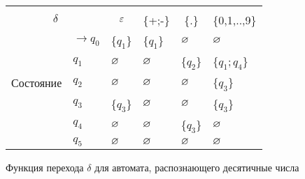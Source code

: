 \begin{figure}[h]
\centering
\begin{tabular}{llllll}
\toprule
%
\multicolumn{2}{c}{\multirow{2}{*}{\Large $\delta$}}
	& \multicolumn{4}{c}{\text{Вход}} \\
%
\cmidrule(rl){3-6}
%
\multicolumn{2}{c}{}
	& \multicolumn{1}{c}{$\varepsilon$}
    & \multicolumn{1}{c}{\{+;-\}}
    & \multicolumn{1}{c}{\{.\}}
    & \multicolumn{1}{c}{\{0,1,..,9\}} \\
%
\midrule
%
\multirow{5}{*}{Состояние}
    & $\to q_0$ & \{$q_1$\} 	& \{$q_1$\} 	& $\varnothing$ 		& $\varnothing$ \\
    & $q_1$ & $\varnothing$ 		& $\varnothing$ 		& \{$q_2$\}     & \{$q_1;q_4$\}     \\
    & $q_2$ & $\varnothing$ 		& $\varnothing$     	& $\varnothing$ 		& \{$q_3$\}     \\
    & $q_3$ & \{$q_3$\} 	& $\varnothing$     	& $\varnothing$     	& \{$q_3$\} \\
    & $q_4$ & $\varnothing$			& $\varnothing$         & \{$q_3$\}     & $\varnothing$         \\
    & $\boxed{q_5}$ & $\varnothing$ 		& $\varnothing$         & $\varnothing$         & $\varnothing$         \\
\bottomrule
\end{tabular}
\caption{Функция перехода $\delta$ для автомата, распознающего десятичные числа}
\label{tab4}
\end{figure}
